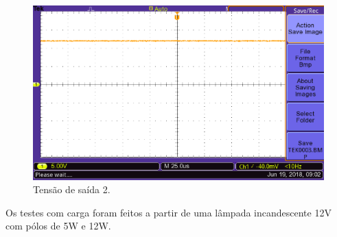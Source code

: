 \begin{figure}[H]
	\centering
	\includegraphics[width=14cm]{figuras/tensaoDois.png}
	\caption{Tensão de saída 2.}
	\label{tensaoDois}
\end{figure}

Os testes com carga foram feitos a partir de uma lâmpada incandescente 12V com pólos de 5W e 12W.

